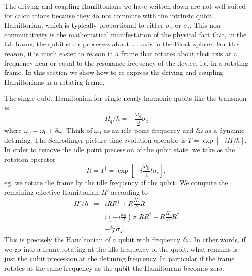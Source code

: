 
The driving and coupling Hamiltonians we have written down are not well suited for calculations because they do not commute with the intrinsic qubit Hamiltonian, which is typically proportional to either $\sigma_x$ or $\sigma_z$.
This non-commutativity is the mathematical manifestation of the physical fact that, in the lab frame, the qubit state processes about an axis in the Block sphere.
For this reason, it is much easier to reason in a frame that rotates about that axis at a frequency near or equal to the resonance frequency of the device, i.e. in a rotating frame.
In this section we show how to re-express the driving and coupling Hamiltonians in a rotating frame.

The single qubit Hamiltonian for single nearly harmonic qubits like the transmon is \begin{equation}
H_q/\hbar = -\frac{\omega_q}{2}\sigma_z \end{equation}
where $\omega_q = \omega_0 + \delta\omega$. Think of $\omega_0$ as an idle point frequency and $\delta \omega$ as a dynamic detuning.
The Schrodinger picture time evolution operator is $T=\exp \left[-i H/\hbar \right]$.
In order to remove the idle point precession of the qubit state, we take as the rotation operator \begin{equation}
R = T^{\dagger} = \exp \left[ -i \frac{\omega_0}{2} t \sigma_z \right], \end{equation}
eg. we rotate the frame by the idle frequency of the qubit.
We compute the remaining effective Hamiltonian $H'$ according to  \begin{eqnarray}
H'/\hbar &=& i\dot{R}R^{\dagger} + R \frac{H_q}{\hbar} R \\
&=& i \left(-i \frac{\omega_0}{2} \right)\sigma_z RR^{\dagger} + R\frac{H_q}{\hbar}R^{\dagger} \\
&=& -\frac{\delta\omega}{2}\sigma_z. \end{eqnarray}
This is precisely the Hamiltonian of a qubit with frequency $\delta\omega$.
In other words, if we go into a frame rotating at the idle frequency of the qubit, what remains is just the qubit precession at the detuning frequency.
In particular if the frame rotates at the same frequency as the qubit the Hamiltonian becomes zero.


